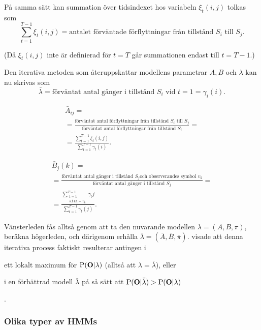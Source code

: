 \documentclass[../rapport_MVEX01-11-05]{subfiles}
\begin{document}
På samma sätt kan summation över tidsindexet hos variabeln
$\xi_t(i,j)$ tolkas som 
\begin{equation*}
\sum_{t=1}^{T-1}\xi_t(i,j) = \text{antalet förväntade förflyttningar
  från tillstånd $S_i$ till $S_j$.}
\end{equation*}

(Då $\xi_t(i,j)$ inte är definierad för $t=T$ går summationen endast
till $t = T -1$.)

Den iterativa metoden som återuppskattar modellens parametrar $A,B$
och $\lambda$ kan nu skrivas som
\begin{equation*}
\bar{\lambda} = \text{förväntat antal gånger i tillstånd $S_i$ vid
  $t=1$} = \gamma_i(i).
\end{equation*}

\begin{multline*}
\bar{A}_{ij} = \\ = \frac{\text{förväntat antal förflyttningar från
    tillstånd $S_i$ till $S_j$}}{\text{förväntat antal förflyttningar
    från tillstånd $S_i$}} = \\ =
\frac{\sum_{t=1}^{T-1}\xi_t(i,j)}{\sum_{t=1}^{T-1}\gamma_t(i)}.
\end{multline*}

\begin{multline*}
\bar{B}_j(k) = \\ = \frac{\text{förväntat antal gånger i tillstånd $S_j$
    och observerandes symbol $v_k$}}{\text{förväntat antal gånger i
    tillstånd $S_j$}} = \\ = \frac{\sum_{\substack{t=1\\s.t~ O_t =
      v_k}}^{T-1}\gamma_t{j}}{\sum_{t=1}^{T-1}\gamma_t(j)}.
\end{multline*}

Vänsterleden fås alltså genom att ta den nuvarande modellen $\lambda =
(A,B,\pi)$, beräkna högerleden, och därigenom erhålla $\bar{\lambda} =
(\bar{A},\bar{B}, \bar{\pi})$.  visade
att denna iterativa process faktiskt resulterar
antingen i
\begin{inparaenum}
	\item ett lokalt maximum för $\mathrm{P}(\textbf{O}|\lambda)$
  (alltså att $\lambda = \bar{\lambda}$), eller
 	\item i en förbättrad modell $\bar{\lambda}$ på så sätt att
  $\mathrm{P}(\textbf{O}|\bar{\lambda}) > \mathrm{P}(\textbf{O}|\lambda)$
\end{inparaenum}. 

\subsubsection{Olika typer av HMMs}
\end{document}
